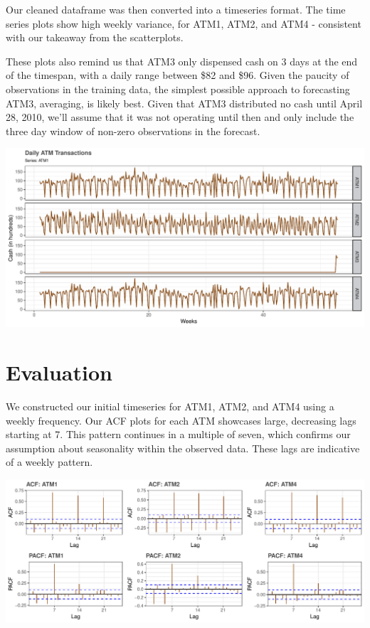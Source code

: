 \documentclass[openany]{book}
\begin{document}
Our cleaned dataframe was then converted into a timeseries format. The
time series plots show high weekly variance, for ATM1, ATM2, and ATM4 -
consistent with our takeaway from the scatterplots.

These plots also remind us that ATM3 only dispensed cash on 3 days at
the end of the timespan, with a daily range between \$82 and \$96. Given
the paucity of observations in the training data, the simplest possible
approach to forecasting ATM3, averaging, is likely best. Given that ATM3
distributed no cash until April 28, 2010, we'll assume that it was not
operating until then and only include the three day window of non-zero
observations in the forecast. \newline

\includegraphics{Group2_Project1_Fall2019_files/figure-latex/unnamed-chunk-3-1.pdf}

\hypertarget{evaluation}{%
\section{Evaluation}\label{evaluation}}

We constructed our initial timeseries for ATM1, ATM2, and ATM4 using a
weekly frequency. Our ACF plots for each ATM showcases large, decreasing
lags starting at 7. This pattern continues in a multiple of seven, which
confirms our assumption about seasonality within the observed data.
These lags are indicative of a weekly pattern.

\includegraphics{Group2_Project1_Fall2019_files/figure-latex/unnamed-chunk-4-1.pdf}
\end{document}
